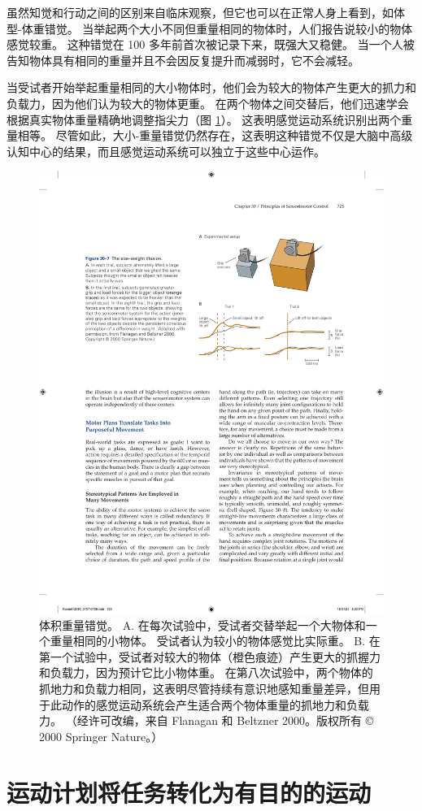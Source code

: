 虽然知觉和行动之间的区别来自临床观察，但它也可以在正常人身上看到，如体型-体重错觉。
当举起两个大小不同但重量相同的物体时，人们报告说较小的物体感觉较重。
这种错觉在 100 多年前首次被记录下来，既强大又稳健。
当一个人被告知物体具有相同的重量并且不会因反复提升而减弱时，它不会减轻。


当受试者开始举起重量相同的大小物体时，他们会为较大的物体产生更大的抓力和负载力，因为他们认为较大的物体更重。 
在两个物体之间交替后，他们迅速学会根据真实物体重量精确地调整指尖力（图 \ref{fig:30_7}）。 
这表明感觉运动系统识别出两个重量相等。
尽管如此，大小-重量错觉仍然存在，这表明这种错觉不仅是大脑中高级认知中心的结果，而且感觉运动系统可以独立于这些中心运作。

\begin{figure}[htbp]
	\centering
	\includegraphics[width=0.6\linewidth]{chap30/fig_30_7}
	\caption{体积重量错觉。 A. 在每次试验中，受试者交替举起一个大物体和一个重量相同的小物体。 受试者认为较小的物体感觉比实际重。 B. 在第一个试验中，受试者对较大的物体（橙色痕迹）产生更大的抓握力和负载力，因为预计它比小物体重。 在第八次试验中，两个物体的抓地力和负载力相同，这表明尽管持续有意识地感知重量差异，但用于此动作的感觉运动系统会产生适合两个物体重量的抓地力和负载力。 （经许可改编，来自 Flanagan 和 Beltzner 2000。版权所有 © 2000 Springer Nature。）}
	\label{fig:30_7}
\end{figure}


\section{运动计划将任务转化为有目的的运动}


